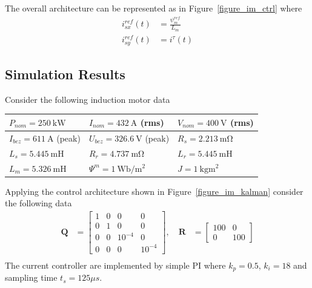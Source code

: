 \documentclass[12pt,a4paper,oneside]{book}
\begin{document}
\begin{onehalfspace}
The overall architecture can be represented as in Figure~\ref{figure_im_ctrl} where
\begin{equation}\label{im_control_problem_eq_20}
	\begin{aligned}
		i_{sx}^{ref}(t) &= \frac{\psi_m^{ref}}{L_m} \\[6pt]
		i_{sy}^{ref}(t) &= i^{\tau}(t)
	\end{aligned}
\end{equation}

\subsection{Simulation Results}
Consider the following induction motor data
\setlength\arrayrulewidth{1pt}
\begin{center}
	\setlength{\extrarowheight}{6pt}
	\begin{tabular}{ | m{10em} | m{10em} | m{10em} |}
		\hline
		$P_{nom} = \SI{250}{\kilo\watt}$ & $I_{nom} = \SI{432}{\ampere}$ (rms) 
		& $V_{nom} = \SI{400}{\volt}$ (rms) \\[6pt]
		\hline
		$I_{bez} = \SI{611}{\ampere}$ (peak) & $U_{bez} = \SI{326.6}{\volt}$ 
		(peak) & $R_{s} = \SI{2.213}{\milli\ohm}$ \\[6pt]
		\hline
		$L_{s} = \SI{5.445}{\milli\henry}$ & $R_{r} = \SI{4.737}{\milli\ohm}$ & 
		$L_{r} = \SI{5.445}{\milli\henry}$ \\[6pt]
		\hline
		$L_{m} = \SI{5.326}{\milli\henry}$ & $\Psi^m = 
		\SI{1}{\weber\per\square\meter}$ & $J = \SI{1}{\kilogram\square\meter}$ 
		\\[6pt]
		\hline
	\end{tabular}
	\captionsetup{width=0.75\textwidth}		
	\label{im_data}
\end{center}

Applying the control architecture shown in Figure~\ref{figure_im_kalman} consider 
the following data
\begin{equation*}
	\begin{aligned}
		\mathbf{Q} &= 
		\begin{bmatrix} 
			1&0&0&0\\[6pt] 
			0&1&0&0\\[6pt] 
			0&0&10^{-4}&0\\[6pt]
			0&0&0&10^{-4}
		\end{bmatrix},\quad
		\mathbf{R} &= \begin{bmatrix} 100&0\\[6pt]
			0&100\end{bmatrix} \\[6pt]
	\end{aligned}
\end{equation*}
The current controller are implemented by simple PI where $	k_p = 0.5$, 
$k_i=18$ and sampling time $t_s=125\mu s$.


\end{onehalfspace}
\end{document}
